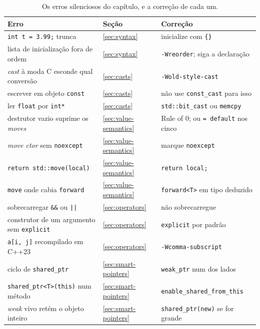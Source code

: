 \begin{table}[htbp]
\centering
\caption{Os erros silenciosos do capítulo, e a correção de cada um.}
\label{tab:sintese-fundamentos}
\footnotesize
\begin{tabular}{@{}p{}p{}p{}@{}}
\toprule
\textbf{Erro} & \textbf{Seção} & \textbf{Correção} \\
\midrule
\texttt{int t = 3.99;} trunca              & \ref{sec:syntax}
    & inicialize com \texttt{\{\}} \\
lista de inicialização fora de ordem       & \ref{sec:syntax}
    & \texttt{-Wreorder}; siga a declaração \\
\emph{cast} à moda C esconde qual conversão & \ref{sec:casts}
    & \texttt{-Wold-style-cast} \\
escrever em objeto \texttt{const}          & \ref{sec:casts}
    & não use \texttt{const\_cast} para isso \\
ler \texttt{float} por \texttt{int*}       & \ref{sec:casts}
    & \texttt{std::bit\_cast} ou \texttt{memcpy} \\
destrutor vazio suprime os \emph{moves}    & \ref{sec:value-semantics}
    & Rule of 0; ou \texttt{= default} nos cinco \\
\emph{move ctor} sem \texttt{noexcept}     & \ref{sec:value-semantics}
    & marque \texttt{noexcept} \\
\texttt{return std::move(local)}           & \ref{sec:value-semantics}
    & \texttt{return local;} \\
\texttt{move} onde cabia \texttt{forward}  & \ref{sec:value-semantics}
    & \texttt{forward<T>} em tipo deduzido \\
sobrecarregar \texttt{\&\&} ou \texttt{||} & \ref{sec:operators}
    & não sobrecarregue \\
construtor de um argumento sem \texttt{explicit} & \ref{sec:operators}
    & \texttt{explicit} por padrão \\
\texttt{a[i, j]} recompilado em C++23      & \ref{sec:operators}
    & \texttt{-Wcomma-subscript} \\
ciclo de \texttt{shared\_ptr}              & \ref{sec:smart-pointers}
    & \texttt{weak\_ptr} num dos lados \\
\texttt{shared\_ptr<T>(this)} num método   & \ref{sec:smart-pointers}
    & \texttt{enable\_shared\_from\_this} \\
\emph{weak} vivo retém o objeto inteiro    & \ref{sec:smart-pointers}
    & \texttt{shared\_ptr(new)} se for grande \\

\end{tabular}
\end{table}
